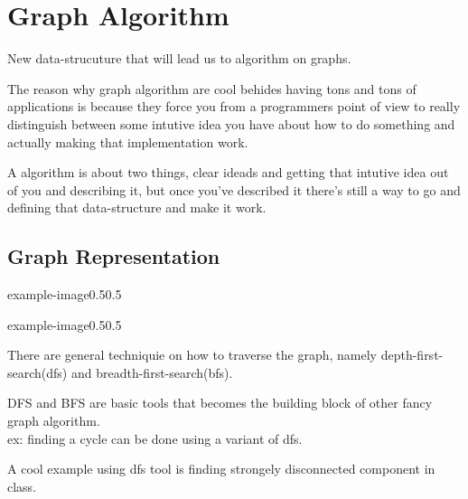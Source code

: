 \chapter{Graph Algorithm}\label{ch:graph}

New data-strucuture that will lead us to algorithm on graphs.

The reason why graph algorithm are cool behides having tons and tons of applications is because they force you from a programmers point of view to really distinguish between some intutive idea you have about how to do something and actually making that implementation work.

A algorithm is about two things, clear ideads and getting that intutive idea out of you and describing it, but once you've described it there's  still a way to go and defining that data-structure and make it work.

\section{Graph Representation}

\begin{lfigure}{example-image}{0.5}{0.5}
    \lipsum[3]
\end{lfigure}

\begin{lfigure}
    {example-image}{0.5}{0.5}
    
\end{lfigure}

There are general techniquie on how to traverse the graph, namely depth-first-search(dfs) and breadth-first-search(bfs).

DFS and BFS are basic tools that becomes the building block of other fancy graph algorithm.\\
ex: finding  a cycle can be done using a variant of dfs.

A cool example using dfs tool is finding strongely disconnected component in class.

